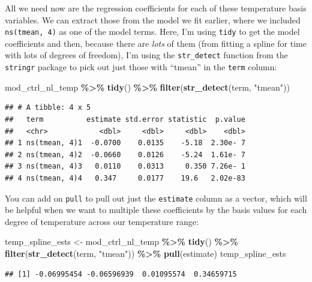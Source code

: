 \documentclass[
]{book}
\newenvironment{Shaded}{\begin{snugshade}}{\end{snugshade}}
\newcommand{\FunctionTok}[1]{\textcolor[rgb]{0.13,0.29,0.53}{\textbf{#1}}}
\newcommand{\NormalTok}[1]{#1}
\newcommand{\OtherTok}[1]{\textcolor[rgb]{0.56,0.35,0.01}{#1}}
\newcommand{\SpecialCharTok}[1]{\textcolor[rgb]{0.81,0.36,0.00}{\textbf{#1}}}
\newcommand{\StringTok}[1]{\textcolor[rgb]{0.31,0.60,0.02}{#1}}
\begin{document}
All we need now are the regression coefficients for each of these temperature basis
variables. We can extract those from the model we fit earlier, where we included
\texttt{ns(tmean,\ 4)} as one of the model terms. Here, I'm using \texttt{tidy} to get the model
coefficients and then, because there are \emph{lots} of them (from fitting a spline for
time with lots of degrees of freedom), I'm using the \texttt{str\_detect} function from the
\texttt{stringr} package to pick out just those with ``tmean'' in the \texttt{term} column:

\begin{Shaded}
\begin{Highlighting}[]
\NormalTok{mod\_ctrl\_nl\_temp }\SpecialCharTok{\%\textgreater{}\%} 
  \FunctionTok{tidy}\NormalTok{() }\SpecialCharTok{\%\textgreater{}\%} 
  \FunctionTok{filter}\NormalTok{(}\FunctionTok{str\_detect}\NormalTok{(term, }\StringTok{"tmean"}\NormalTok{))}
\end{Highlighting}
\end{Shaded}

\begin{verbatim}
## # A tibble: 4 x 5
##   term          estimate std.error statistic  p.value
##   <chr>            <dbl>     <dbl>     <dbl>    <dbl>
## 1 ns(tmean, 4)1  -0.0700    0.0135    -5.18  2.30e- 7
## 2 ns(tmean, 4)2  -0.0660    0.0126    -5.24  1.61e- 7
## 3 ns(tmean, 4)3   0.0110    0.0313     0.350 7.26e- 1
## 4 ns(tmean, 4)4   0.347     0.0177    19.6   2.02e-83
\end{verbatim}

You can add on \texttt{pull} to pull out just the \texttt{estimate} column as a vector, which will be
helpful when we want to multiple these coefficients by the basis values for each degree
of temperature across our temperature range:

\begin{Shaded}
\begin{Highlighting}[]
\NormalTok{temp\_spline\_ests }\OtherTok{\textless{}{-}}\NormalTok{ mod\_ctrl\_nl\_temp }\SpecialCharTok{\%\textgreater{}\%} 
  \FunctionTok{tidy}\NormalTok{() }\SpecialCharTok{\%\textgreater{}\%} 
  \FunctionTok{filter}\NormalTok{(}\FunctionTok{str\_detect}\NormalTok{(term, }\StringTok{"tmean"}\NormalTok{)) }\SpecialCharTok{\%\textgreater{}\%} 
  \FunctionTok{pull}\NormalTok{(estimate)}
\NormalTok{temp\_spline\_ests}
\end{Highlighting}
\end{Shaded}

\begin{verbatim}
## [1] -0.06995454 -0.06596939  0.01095574  0.34659715
\end{verbatim}
\end{document}
